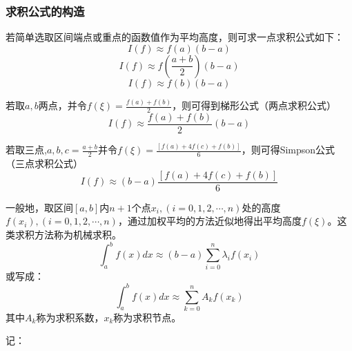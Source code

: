 \subsubsection{求积公式的构造}

 若简单选取区间端点或重点的函数值作为平均高度，则可求一点求积公式如下：
    \begin{equation*}\label{eqn:左矩形公式}
        I(f)\approx f(a)(b-a)
    \end{equation*}
    \begin{equation*}\label{eqn:中矩形公式}
        I(f)\approx f(\frac{a+b}{2})(b-a)
    \end{equation*}
    \begin{equation*}\label{eqn:右矩形公式}
        I(f)\approx f(b)(b-a)
    \end{equation*}

\begin{definition}[两点求积公式]
    若取$a,b$两点，并令$f(\xi ) = \frac{f(a)+f(b)}{2}$，则可得到梯形公式（两点求积公式）
    \begin{equation*}
        I(f)\approx \frac{f(a)+f(b)}{2}(b-a)
    \end{equation*}
\end{definition}

\begin{definition}
    若取三点,$a,b,c = \frac{a+b}{2}$并令$f(\xi ) = \frac{[f(a)+4f(c)+f(b)]}{6}$，则可得Simpson公式（三点求积公式）
    \begin{equation*}
        I(f)\approx (b-a)\frac{[f(a)+4f(c)+f(b)]}{6}
    \end{equation*}  
\end{definition}

\begin{definition}[机械求积]
    一般地，取区间$[a,b]$内$n+1$个点${x_i},(i=0,1,2,\cdots,n)$处的高度${f(x_i)},(i=0,1,2,\cdots,n)$，通过加权平均的方法近似地得出平均高度$f(\xi )$。这类求积方法称为机械求积。
    \begin{equation*}
        \int_{a}^{b}f(x)dx \approx (b-a)\sum_{i=0}^{n}\lambda_if(x_i)
    \end{equation*}
    或写成：
    \begin{equation*}[数值积分公式]
        \int_{a}^{b}f(x)dx \approx \sum_{k=0}^{n}A_kf(x_k)
    \end{equation*}
    其中$A_k$称为求积系数，$x_k$称为求积节点。
\end{definition}

记：

